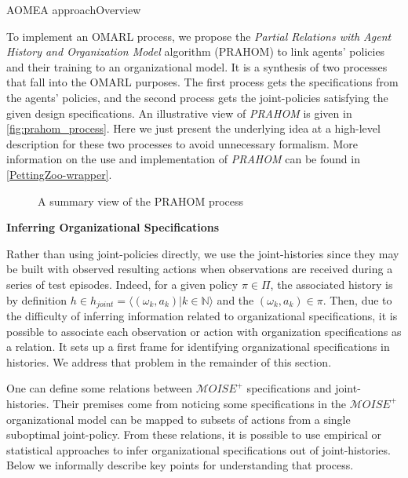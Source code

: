 \begin{frame}{AOMEA approach}{Overview}


    To implement an OMARL process, we propose the \emph{Partial Relations with Agent History and Organization Model} algorithm (PRAHOM) to link agents' policies and their training to an organizational model.
    It is a synthesis of two processes that fall into the OMARL purposes. The first process gets the specifications from the agents' policies, and the second process gets the joint-policies satisfying the given design specifications. An illustrative view of \emph{PRAHOM} is given in \autoref{fig:prahom_process}.
    Here we just present the underlying idea at a high-level description for these two processes to avoid unnecessary formalism. More information on the use and implementation of \emph{PRAHOM} can be found in \autoref{PettingZoo-wrapper}.

    \begin{figure}[h!]
        \centering
        
        \caption{A summary view of the PRAHOM process}
        \label{fig:prahom_process}
    \end{figure}


    \textbf{Inferring Organizational Specifications}

    Rather than using joint-policies directly, we use the joint-histories since they may be built with observed resulting actions when observations are received during a series of test episodes. Indeed, for a given policy $\pi \in \Pi$, the associated history is by definition $h \in h_{joint} = \langle(\omega_k,a_k) | k \in \mathbb{N}\rangle$ and the $(\omega_k,a_k) \in \pi$.
    Then, due to the difficulty of inferring information related to organizational specifications, it is possible to associate each observation or action with organization specifications as a  relation. It sets up a first frame for identifying organizational specifications in histories. We address that problem in the remainder of this section.

    One can define some relations between $\mathcal{M}OISE^+$ specifications and joint-histories. Their premises come from noticing some specifications in the $\mathcal{M}OISE^+$ organizational model can be mapped to subsets of actions from a single suboptimal joint-policy.
    From these relations, it is possible to use empirical or statistical approaches to infer organizational specifications out of joint-histories. Below we informally describe key points for understanding that process.


\end{frame}
